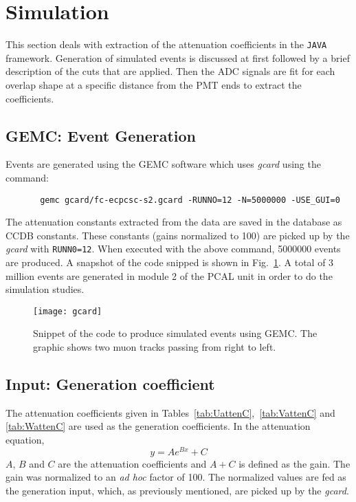 \section{Simulation}
\label{Sec:simulation}
This section deals with extraction of the attenuation coefficients in the \texttt{JAVA} framework. Generation of simulated events is
discussed at first followed by a brief description of the cuts that are applied. Then the ADC signals are fit for each overlap shape
at a specific distance from the PMT ends to extract the coefficients.

\FloatBarrier
\subsection{GEMC: Event Generation}
Events are generated using the GEMC software which uses \textit{gcard} using the command:
\begin{verbatim}
       gemc gcard/fc-ecpcsc-s2.gcard -RUNNO=12 -N=5000000 -USE_GUI=0
\end{verbatim}
The attenuation constants extracted from the data are saved in the database as CCDB constants. These constants 
(gains normalized to 100) are picked up by the \textit{gcard} with \texttt{RUNN0=12}. When executed with the above command, 5000000 events
are produced. A snapshot of the code snipped is shown in Fig.~\ref{fig:gcard}. A total of 3 million events are
generated in module 2 of the PCAL unit in order to do the simulation studies.

\begin{figure}[h]
    \centering
    \texttt{[image: gcard]}
    \caption{Snippet of the code to produce simulated events using GEMC. The graphic shows two muon tracks passing from 
    right to left.}
    \label{fig:gcard}
\end{figure}
\FloatBarrier

\subsection{Input: Generation coefficient}
The attenuation coefficients given in Tables~\ref{tab:UattenC},~\ref{tab:VattenC} and \ref{tab:WattenC} are used as the generation
coefficients. In the attenuation equation,
\begin{equation}
y = A e^{Bx} + C
\label{eq:attn}
\end{equation}
$A$, $B$ and $C$ are the attenuation coefficients and $A+C$ is defined as the gain. The gain was normalized to an \textit{ad hoc}
factor of 100. The normalized values are fed as the generation input, which, as previously mentioned, are picked up by the
\textit{gcard}.

